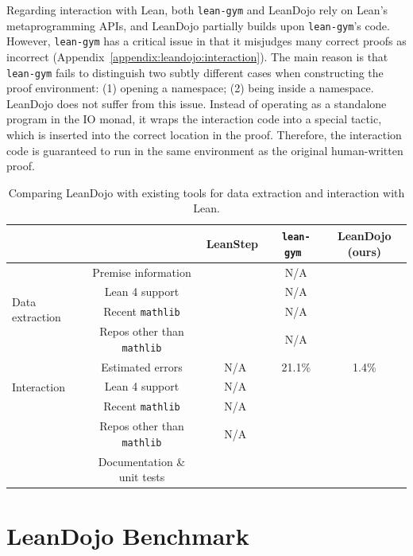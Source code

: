 \documentclass{article}
\newcommand{\cmark}{\ding{51}}
\newcommand{\xmark}{\ding{55}}
\begin{document}
Regarding interaction with Lean, both \texttt{lean-gym} and LeanDojo rely on Lean's metaprogramming APIs, and LeanDojo partially builds upon \texttt{lean-gym}'s code. However, \texttt{lean-gym} has a critical issue in that it misjudges many correct proofs as incorrect (Appendix~\ref{appendix:leandojo:interaction}). The main reason is that \texttt{lean-gym} fails to distinguish two subtly different cases when constructing the proof environment: (1) opening a namespace; (2) being inside a namespace. LeanDojo does not suffer from this issue. Instead of operating as a standalone program in the IO monad, it wraps the interaction code into a special tactic, which is inserted into the correct location in the proof. Therefore, the interaction code is guaranteed to run in the same environment as the original human-written proof.


\begin{table}[ht]
  \centering
  \begin{tabular}{@{}lcccc@{}}
    \toprule
    & & LeanStep~\cite{han2022proof} & \texttt{lean-gym}~\cite{polu2023formal} & LeanDojo (ours) \\
    \midrule
    \multirow{4}{*}{Data extraction} & Premise information & \xmark & N/A & \cmark \\
    & Lean 4 support & \xmark & N/A & \cmark \\
    & Recent \texttt{mathlib} & \xmark & N/A & \cmark \\
    & Repos other than \texttt{mathlib} & \xmark & N/A & \cmark \\
    \midrule
    \multirow{3}{*}{Interaction} & Estimated errors & N/A & 21.1\% & 1.4\% \\
    & Lean 4 support & N/A & \xmark & \cmark \\
    & Recent \texttt{mathlib} & N/A & \xmark & \cmark \\
    & Repos other than \texttt{mathlib} & N/A & \cmark & \cmark \\
    \midrule
    & Documentation \& unit tests & \xmark & \xmark & \cmark \\
    \bottomrule
  \end{tabular}
  \caption{Comparing LeanDojo with existing tools for data extraction and interaction with Lean.}
  \label{table:comparison}
\end{table}



\section{LeanDojo Benchmark}
\label{appendix:benchmark}
\end{document}
